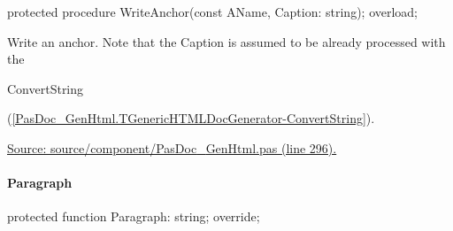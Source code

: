 \documentclass{report}
\newif\ifpdf
\begin{document}
\label{PasDoc_GenHtml.TGenericHTMLDocGenerator-WriteAnchor}
\begin{list}{}{
\setlength{\itemindent}{0cm}
\setlength{\listparindent}{0cm}
\setlength{\leftmargin}{\evensidemargin}
\addtolength{\leftmargin}{\tmplength}
\settowidth{\labelsep}{X}
\addtolength{\leftmargin}{\labelsep}
\setlength{\labelwidth}{\tmplength}
}
\item[\textbf{Declaration}\hfill]
\ifpdf
\begin{flushleft}
\fi
\begin{ttfamily}
protected procedure WriteAnchor(const AName, Caption: string); overload;\end{ttfamily}

\ifpdf
\end{flushleft}
\fi

\par
\item[\textbf{Description}]
Write an anchor. Note that the Caption is assumed to be already processed with the \begin{ttfamily}ConvertString\end{ttfamily}(\ref{PasDoc_GenHtml.TGenericHTMLDocGenerator-ConvertString}).\par
\href{https://github.com/pasdoc/pasdoc/blob/master/source/component/PasDoc_GenHtml.pas#L296}{Source: source/component/PasDoc{\_}GenHtml.pas (line 296).}

\end{list}
\paragraph*{Paragraph}\hspace*{\fill}

\label{PasDoc_GenHtml.TGenericHTMLDocGenerator-Paragraph}
\begin{list}{}{
\setlength{\itemindent}{0cm}
\setlength{\listparindent}{0cm}
\setlength{\leftmargin}{\evensidemargin}
\addtolength{\leftmargin}{\tmplength}
\settowidth{\labelsep}{X}
\addtolength{\leftmargin}{\labelsep}
\setlength{\labelwidth}{\tmplength}
}
\item[\textbf{Declaration}\hfill]
\ifpdf
\begin{flushleft}
\fi
\begin{ttfamily}
protected function Paragraph: string; override;\end{ttfamily}

\ifpdf
\end{flushleft}
\fi

\end{list}
\end{document}
